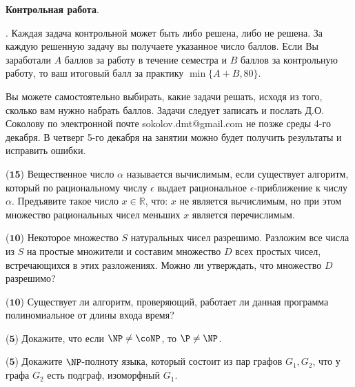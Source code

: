 \setcounter{curtask}{1}


\begin{center}
	{\bf Контрольная работа}.
\end{center}


.
Каждая задача контрольной может быть либо решена, либо не решена. За каждую решенную
задачу вы получаете указанное число баллов.  Если Вы заработали $A$ баллов за работу
в течение семестра и $B$ баллов за контрольную работу, то ваш итоговый балл за
практику $\min \{A + B, 80\}$.

Вы можете самостоятельно выбирать, какие задачи решать, исходя из того, сколько вам
нужно набрать баллов. Задачи следует записать и послать Д.О. Соколову по электронной
почте sokolov.dmt@gmail.com не позже среды 4-го декабря. В четверг 5-го декабря на
занятии можно будет получить результаты и исправить ошибки.

\breakline

\begin{task} ($\mathbf{15}$)
	Вещественное число $\alpha$ называется вычислимым, если существует алгоритм,
    который по рациональному числу $\epsilon$ выдает рациональное
    $\epsilon$-приближение к числу $\alpha$.  Предъявите такое число $x \in
    \mathbb{R}$, что: $x$ не является вычислимым, но при этом множество рациональных
    чисел меньших $x$ является перечислимым.
\end{task}

\begin{task} ($\mathbf{10}$)
	Некоторое множество $S$ натуральных чисел разрешимо. Разложим все числа из $S$ на
    простые множители и составим множество $D$ всех простых чисел, встречающихся в
    этих разложениях. Можно ли утверждать, что множество $D$ разрешимо?
\end{task}

\begin{task}($\mathbf{10}$)
    Существует ли алгоритм, проверяющий, работает ли данная программа полиномиальное
    от длины входа время?
\end{task}

\begin{task}($\mathbf{5}$)
    Докажите, что если $\NP \neq \coNP$, то $\P \neq \NP$.
\end{task}


\begin{task} ($\mathbf{5}$)
	Докажите $\NP$-полноту языка, который состоит из пар графов $G_1,G_2$, что у
    графа $G_2$ есть подграф, изоморфный $G_1$.
\end{task}

